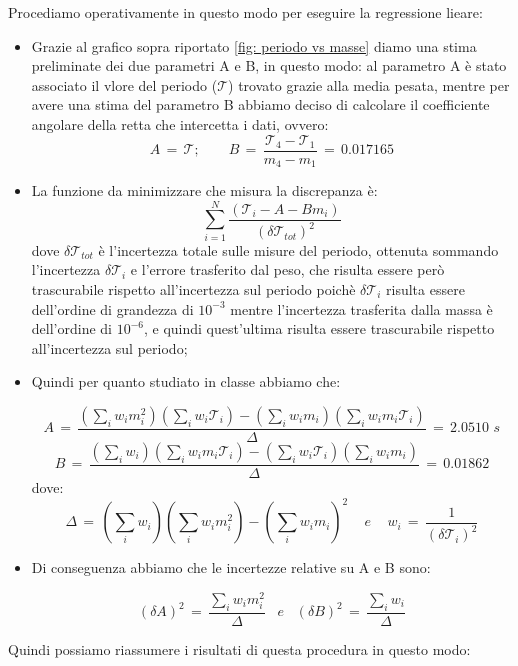 Procediamo operativamente in questo modo per eseguire la regressione lieare:

\begin{itemize}
	\item{Grazie al grafico sopra riportato \ref{fig: periodo vs masse} diamo una stima preliminate dei due parametri A e B, in questo modo: al parametro A è stato associato il vlore del periodo ($\mathcal{T}$) trovato grazie alla media pesata, mentre per avere una stima del parametro B abbiamo deciso di calcolare il coefficiente angolare della retta che intercetta i dati, ovvero:
			\begin{equation*}
				A \,=\, \mathcal{T}; \quad \quad B \,=\, \frac{\mathcal{T}_4 - \mathcal{T}_1}{m_4 - m_1} \,=\, 0.017165
			\end{equation*}
			}
	\item{La funzione da minimizzare che misura la discrepanza è:
			\begin{equation}
                \sum_{i=1}^{N} \frac{(\mathcal{T}_i - A - B m_i)}{(\delta \mathcal{T}_{tot})^2}	
                \label{eq:min_quad}
			\end{equation}
            dove $\delta \mathcal{T}_{tot}$ è l'incertezza totale sulle misure del periodo, ottenuta sommando l'incertezza $\delta \mathcal{T}_i$ e l'errore trasferito dal peso, che risulta essere però trascurabile rispetto all'incertezza sul periodo poichè $\delta \mathcal{T}_i$ risulta essere dell'ordine di grandezza di $10^{-3}$ mentre l'incertezza trasferita dalla massa è dell'ordine di $10^{-6}$, e quindi quest'ultima risulta essere trascurabile rispetto all'incertezza sul periodo;}
	\item{Quindi per quanto studiato in classe abbiamo che:

			\begin{equation*}
				A \,=\, \frac{(\sum_i w_i m_i^2)(\sum_i w_i \mathcal{T}_i) - (\sum_i w_i m_i)(\sum_i w_i m_i \mathcal{T}_i)}{\Delta} \,=\, 2.0510 \,\, s
			\end{equation*}
			\begin{equation*}
				B \,=\, \frac{(\sum_i w_i)(\sum_i w_i m_i \mathcal{T}_i) - (\sum_i w_i \mathcal{T}_i)(\sum_i w_i m_i)}{\Delta} \,=\, 0.01862
			\end{equation*}
			dove:
			\begin{equation*}
				\Delta \,=\, (\sum_i w_i)(\sum_i w_i m_i^2) - (\sum_i w_i m_i)^2 \,\,\,\,\,\,\, e \,\,\,\,\,\,\,
				w_i \,=\, \frac{1}{(\delta \mathcal{T}_i)^2}
			\end{equation*}}
	\item{Di conseguenza abbiamo che le incertezze relative su A e B sono:

			\begin{equation*}
				(\delta A)^2 \,=\, \frac{\sum_i w_i m_i^2}{\Delta}  \,\,\,\,\, e \,\,\,\,\,
				(\delta B)^2 \,=\, \frac{\sum_i w_i}{\Delta} 
			\end{equation*}}
	\end{itemize} 
	Quindi possiamo riassumere i risultati di questa procedura in questo modo:

